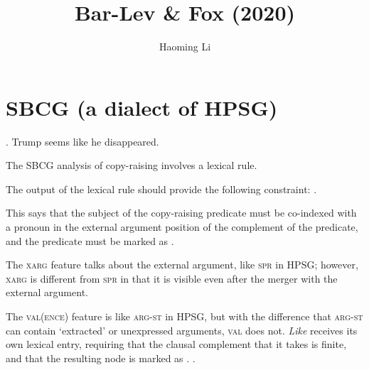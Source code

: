 \documentclass[11pt]{article}
\title{Bar-Lev \& Fox (2020)}
\author{Haoming Li}
\begin{document}
\section{SBCG (a dialect of HPSG)}
\label{sec:sbcg_a_dialect_of_hpsg}

\ex. Trump seems like he disappeared.

The SBCG analysis of copy-raising involves a lexical rule.

The output of the lexical rule should provide the following constraint:
\ex. 

This says that the subject of the copy-raising predicate must be co-indexed with a pronoun in the external argument position of the complement of the predicate, and the predicate must be marked as .

The \textsc{xarg} feature talks about the external argument, like \textsc{spr} in HPSG; however, \textsc{xarg} is different from \textsc{spr} in that it is visible even after the merger with the external argument.

The \textsc{val(ence)} feature is like \textsc{arg-st} in HPSG, but with the difference that \textsc{arg-st} can contain `extracted' or unexpressed arguments, \textsc{val} does not.
\emph{Like} receives its own lexical entry, requiring that the clausal complement that it takes is finite, and that the resulting node is marked as .
\ex. 
\end{document}
